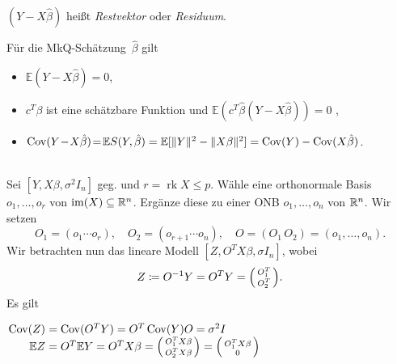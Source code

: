 \documentclass{cheat-sheet}
\newcommand{\E}{\mathbb{E}} %
\DeclareMathOperator{\rk}{rk} %
\DeclareMathOperator{\cov}{Cov} %
\begin{document}
\begin{defn}
  $(Y - X \hat{\beta})$ \enspace
  heißt \emph{Restvektor} oder \emph{Residuum}.
\end{defn}

\begin{lem}
  Für die MkQ-Schätzung~$\hat{\beta}$ gilt
  \begin{itemize}
    \item $\E (Y - X \hat\beta) = 0$,
    \item $c^T \beta$ ist eine schätzbare Funktion und $\E (c^T \hat{\beta} (Y - X \hat\beta)) = 0$ ,
    \item $\cov(Y \!-\! X \hat\beta) \!=\! \E S(Y, \hat{\beta}) = \E [\norm{Y}^2 - \norm{X \beta}^2] = \cov(Y) - \cov(X \hat\beta)$.
  \end{itemize}
\end{lem}

\begin{verf} \mbox{} \\
  Sei $[Y, X \beta, \sigma^2 I_n]$ geg. und $r = \rk X \leq p$.
  Wähle eine orthonormale Basis $o_1, \ldots, o_r$ von $\operatorname{im}(X) \subseteq \mathbb{R}^n$.
  Ergänze diese zu einer ONB $o_1, \ldots, o_n$ von $\mathbb{R}^n$.
  Wir setzen
  \[
    O_1 = (o_1 \cdots o_r), \quad
    O_2 = (o_{r+1} \cdots o_n), \quad
    O = (O_1 \, O_2) = (o_1, \ldots, o_n).
  \]
  Wir betrachten nun das lineare Modell $[Z, O^T X \beta, \sigma I_n]$, wobei
  \[
    Z \coloneqq O^{-1} Y = O^T Y = \begin{psmallmatrix}
      O_1^T \\ O_2^T
    \end{psmallmatrix}.
  \]
  Es gilt \enspace
  \begin{minipage}[t]{0.7 \linewidth}
    $
      \setlength\arraycolsep{1.5pt}
      \begin{array}[t]{r l}
        \cov(Z) & = \cov(O^T Y) = O^T \cov(Y) O = \sigma^2 I \\
        \E Z & = O^T \E Y = O^T X \beta = \begin{psmallmatrix}
          O_1^T X \beta \\ O_2^T X \beta
        \end{psmallmatrix} = \begin{psmallmatrix}
          O_1^T X \beta \\ 0
        \end{psmallmatrix}
      \end{array}
    $
  \end{minipage}
\end{verf}
\end{document}
